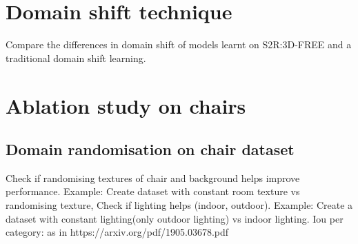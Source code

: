 \section{Domain shift technique}

Compare the differences in domain shift of models learnt on S2R:3D-FREE and a traditional domain shift learning.

\section{Ablation study on chairs}

\subsection{Domain randomisation on chair dataset}

Check if randomising textures of chair and background helps improve performance.  Example: Create dataset with constant room texture vs randomising texture,
Check if lighting helps (indoor, outdoor). Example: Create a dataset with constant lighting(only outdoor lighting) vs indoor lighting.
Iou per category: as in https://arxiv.org/pdf/1905.03678.pdf
